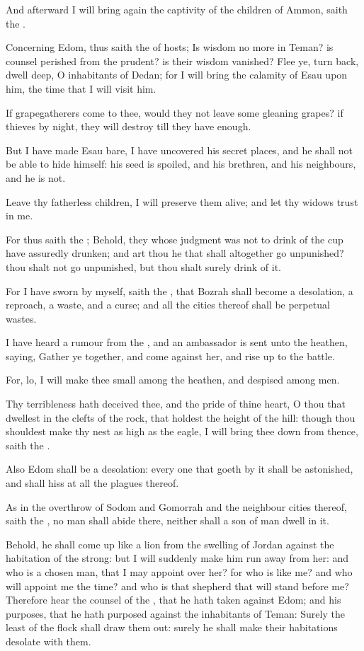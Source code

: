 \verse And afterward I will bring again the captivity of the children of Ammon, saith the \LORD.

\verse Concerning Edom, thus saith the \LORD of hosts; Is wisdom no more in Teman? is counsel perished from the prudent? is their wisdom vanished?  \verse Flee ye, turn back, dwell deep, O inhabitants of Dedan; for I will bring the calamity of Esau upon him, the time that I will visit him.

\verse If grapegatherers come to thee, would they not leave some gleaning grapes? if thieves by night, they will destroy till they have enough.

\verse But I have made Esau bare, I have uncovered his secret places, and he shall not be able to hide himself: his seed is spoiled, and his brethren, and his neighbours, and he is not.

\verse Leave thy fatherless children, I will preserve them alive; and let thy widows trust in me.

\verse For thus saith the \LORD; Behold, they whose judgment was not to drink of the cup have assuredly drunken; and art thou he that shall altogether go unpunished? thou shalt not go unpunished, but thou shalt surely drink of it.

\verse For I have sworn by myself, saith the \LORD, that Bozrah shall become a desolation, a reproach, a waste, and a curse; and all the cities thereof shall be perpetual wastes.

\verse I have heard a rumour from the \LORD, and an ambassador is sent unto the heathen, saying, Gather ye together, and come against her, and rise up to the battle.

\verse For, lo, I will make thee small among the heathen, and despised among men.

\verse Thy terribleness hath deceived thee, and the pride of thine heart, O thou that dwellest in the clefts of the rock, that holdest the height of the hill: though thou shouldest make thy nest as high as the eagle, I will bring thee down from thence, saith the \LORD.

\verse Also Edom shall be a desolation: every one that goeth by it shall be astonished, and shall hiss at all the plagues thereof.

\verse As in the overthrow of Sodom and Gomorrah and the neighbour cities thereof, saith the \LORD, no man shall abide there, neither shall a son of man dwell in it.

\verse Behold, he shall come up like a lion from the swelling of Jordan against the habitation of the strong: but I will suddenly make him run away from her: and who is a chosen man, that I may appoint over her?  for who is like me? and who will appoint me the time? and who is that shepherd that will stand before me?  \verse Therefore hear the counsel of the \LORD, that he hath taken against Edom; and his purposes, that he hath purposed against the inhabitants of Teman: Surely the least of the flock shall draw them out: surely he shall make their habitations desolate with them.

